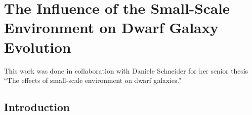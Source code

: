 \chapter[Small-Scale Environment]{The Influence of the Small-Scale Environment on Dwarf Galaxy Evolution}\label{ch:smallScaleEnvironment}


This work was done in collaboration with Daniele Schneider for her senior thesis 
``The effects of small-scale environment on dwarf galaxies.''




\section{Introduction}

%
%

